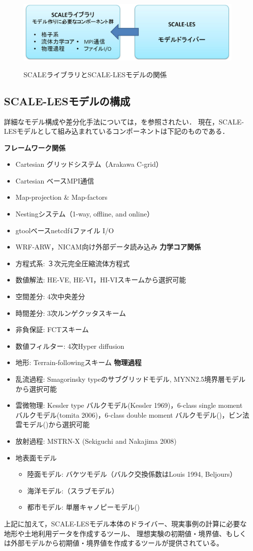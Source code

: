 \begin{figure}[t]
\begin{center}
  \includegraphics[width=0.9\hsize]{./figure/scale_and_scale-les.eps}\\
  \caption{SCALEライブラリとSCALE-LESモデルの関係}
  \label{fig:scale-les}
\end{center}
\end{figure}


\subsection{SCALE-LESモデルの構成}
詳細なモデル構成や差分化手法については，\cite{scale_2015}を参照されたい．
現在，SCALE-LESモデルとして組み込まれているコンポーネントは下記のものである．

{\bf フレームワーク関係}
\begin{itemize}
\item Cartesian グリッドシステム（Arakawa C-grid）
\item Cartesian ベースMPI通信
\item Map-projection \& Map-factors
\item Nestingシステム（1-way, offline, and online）
\item gtoolベースnetcdf4ファイル I/O
\item WRF-ARW，NICAM向け外部データ読み込み
{\bf 力学コア関係}
\item 方程式系: ３次元完全圧縮流体方程式
\item 数値解法: HE-VE,  HE-VI，HI-VIスキームから選択可能
\item 空間差分: 4次中央差分
\item 時間差分: 3次ルンゲクッタスキーム
\item 非負保証: FCTスキーム
\item 数値フィルター: 4次Hyper diffusion
\item 地形: Terrain-followingスキーム
{\bf 物理過程}
\item 乱流過程: Smagorinsky typeのサブグリッドモデル, MYNN2.5境界層モデルから選択可能
\item 雲微物理: Kessler type バルクモデル(Kessler 1969)，6-class single moment バルクモデル(tomita 2006)，6-class double moment バルクモデル(\cite{sn_2014})，ビン法雲モデル(\cite{suzuki_etal_2010})から選択可能
\item 放射過程: MSTRN-X (Sekiguchi and Nakajima 2008)
\item 地表面モデル
 \begin{itemize}
  \item 陸面モデル: バケツモデル（バルク交換係数はLouis 1994, Beljours）
  \item 海洋モデル:（スラブモデル）
  \item 都市モデル: 単層キャノピーモデル(\cite{kusaka_2001})
 \end{itemize}
\end{itemize}

上記に加えて，SCALE-LESモデル本体のドライバー、現実事例の計算に必要な地形や土地利用データを作成するツール、
理想実験の初期値・境界値、もしくは外部モデルから初期値・境界値を作成するツールが提供されている。
